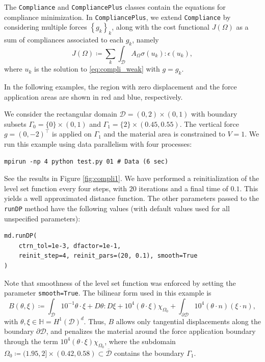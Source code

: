 \documentclass[preprint,9pt]{elsarticle}
\begin{document}
The \texttt{Compliance} and \texttt{CompliancePlus} classes
contain the equations for compliance minimization.
In \texttt{CompliancePlus}, we extend \texttt{Compliance} by considering
multiple forces $\left\{g_k\right\}_k$, along with
the cost functional $J(\Omega)$ as a sum of compliances associated to each $g_k$, namely
\begin{equation} \label{eq:compli_plus}
	J(\Omega) \coloneqq \sum_{k} \int_{\mathcal{D}} A_{\Omega}\sigma(u_k):\epsilon(u_k),
\end{equation}
where $u_k$ is the solution to \eqref{eq:compli_weak} with $g=g_k$.

In the following examples, the region with zero displacement and
the force application areas are shown in red and blue, respectively.

\begin{example}\label{ex:compli1}
We consider the rectangular domain $\mathcal{D} = (0, 2)\times(0, 1)$
with boundary subsets $\Gamma_0 = \{0\} \times (0, 1)$
and $\Gamma_1 = \{2\} \times (0.45,0.55)$.
The vertical force $g = (0, -2)^\top$ is applied on $\Gamma_1$ and
the material area is constrained to $V = 1$.
We run this example using data parallelism with four processes:
\begin{lstlisting}
mpirun -np 4 python test.py 01 # Data (6 sec)
\end{lstlisting}
See the results in Figure \ref{fig:compli1}. 
We have performed a reinitialization of the level set function
every four steps, with $20$ iterations and a final time of $0.1$.
This yields a well approximated distance function.
The other parameters passed to the \texttt{runDP} method
have the following values
(with default values used for all unspecified parameters): 
\begin{lstlisting}
md.runDP(
	ctrn_tol=1e-3, dfactor=1e-1,
	reinit_step=4, reinit_pars=(20, 0.1), smooth=True
)
\end{lstlisting} 
Note that smoothness of the level set function was enforced by setting
the parameter \texttt{smooth=True}.
The bilinear form used in this example is
\begin{equation}\label{eq:compli1_bili}
	B(\theta, \xi) \coloneqq \int_{\mathcal{D}} {10}^{-1}\theta \cdot \xi +
	D\theta :D\xi+{10}^4(\theta\cdot\xi)\chi_{\Omega_0}
	+ \int_{\partial\mathcal{D}} {10}^4 (\theta \cdot n)(\xi \cdot n),
\end{equation}	
with $\theta, \xi \in \mathbb{H} = H^1(\mathcal{D})^d$. Thus, $B$
allows only tangential displacements along the boundary $\partial \mathcal{D}$, and
penalizes the material around the force application boundary through the term ${10}^4(\theta\cdot\xi)\chi_{\Omega_0}$, where
the subdomain
$
\Omega_0 \coloneqq (1.95,2]\times (0.42, 0.58) \subset \overline{\mathcal{D}}
$
contains the boundary $\Gamma_1$.
\end{example}
\end{document}
